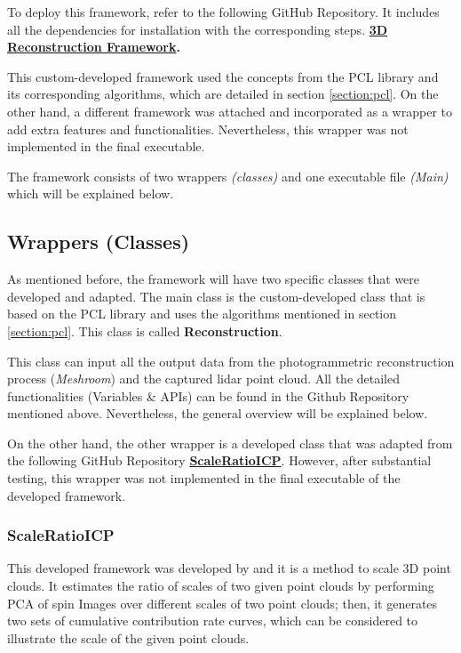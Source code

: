 \documentclass[12pt]{report}
\begin{document}
To deploy this framework, refer to the following GitHub Repository. It includes all the dependencies for installation with the corresponding steps. 
\textbf{\href{https://github.com/esteban-andrade/3D-Reconstructrion-Scanner} {3D Reconstruction Framework}.}

This custom-developed framework used the concepts from the PCL library and its corresponding algorithms, which are detailed in section \ref{section:pcl}.
On the other hand, a different framework was attached and incorporated as a wrapper to add extra features and functionalities.
Nevertheless, this wrapper was not implemented in the final executable. 

The framework consists of two wrappers \textit{(classes)} and one executable file \textit{(Main)} which will be explained below.






\subsection{Wrappers (Classes)}
As mentioned before, the framework will have two specific classes that were developed and adapted.
The main class is the custom-developed class that is based on the PCL library and uses the algorithms mentioned in section \ref{section:pcl}. This class is called \textbf{Reconstruction}.

This class can input all the output data from the photogrammetric reconstruction process (\textit{Meshroom}) and the captured lidar point cloud.
All the detailed functionalities (Variables \& APIs) can be found in the Github Repository mentioned above. Nevertheless, the general overview will be explained below. 

On the other hand, the other wrapper is a developed class that was adapted from the following GitHub Repository \textbf{\href{https://github.com/linbaowei/ScaleRatioICP} {ScaleRatioICP}}.
However, after substantial testing, this wrapper was not implemented in the final executable of the developed framework. 




\subsubsection{ScaleRatioICP}
This developed framework was developed by  and it is a method to scale 3D point clouds. 
It estimates the ratio of scales of two given point clouds by performing PCA of spin Images over different scales of two point clouds; then, it generates two sets of cumulative contribution rate curves, which can be considered
to illustrate the scale of the given point clouds. 
\end{document}
